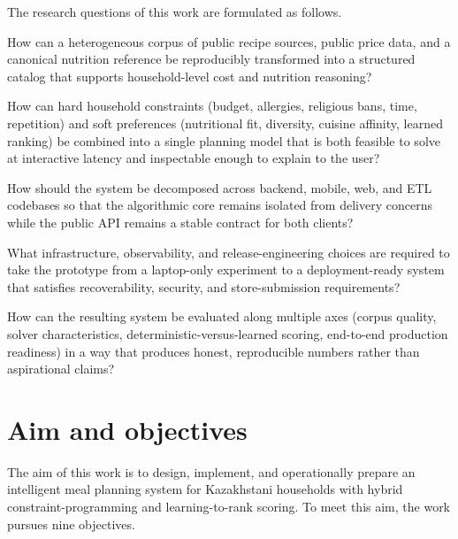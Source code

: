 The research questions of this work are formulated as follows.

\begin{description}[style=multiline,leftmargin=1.6cm,labelwidth=1.4cm]
  \item[RQ1] How can a heterogeneous corpus of public recipe sources, public price data, and a canonical nutrition reference be reproducibly transformed into a structured catalog that supports household-level cost and nutrition reasoning?
  \item[RQ2] How can hard household constraints (budget, allergies, religious bans, time, repetition) and soft preferences (nutritional fit, diversity, cuisine affinity, learned ranking) be combined into a single planning model that is both feasible to solve at interactive latency and inspectable enough to explain to the user?
  \item[RQ3] How should the system be decomposed across backend, mobile, web, and ETL codebases so that the algorithmic core remains isolated from delivery concerns while the public API remains a stable contract for both clients?
  \item[RQ4] What infrastructure, observability, and release-engineering choices are required to take the prototype from a laptop-only experiment to a deployment-ready system that satisfies recoverability, security, and store-submission requirements?
  \item[RQ5] How can the resulting system be evaluated along multiple axes (corpus quality, solver characteristics, deterministic-versus-learned scoring, end-to-end production readiness) in a way that produces honest, reproducible numbers rather than aspirational claims?
\end{description}

\section{Aim and objectives}

The aim of this work is to design, implement, and operationally prepare an intelligent meal planning system for Kazakhstani households with hybrid constraint-programming and learning-to-rank scoring. To meet this aim, the work pursues nine objectives.

